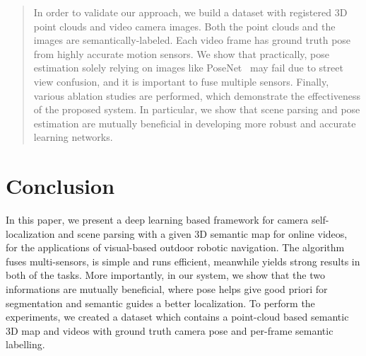 \documentclass[10pt,twocolumn,letterpaper]{article}
\begin{document}
\begin{abstract}
In order to validate our approach, we build a dataset with registered 3D point clouds and video camera images. Both the point clouds and the images are semantically-labeled. Each video frame has ground truth pose from highly accurate motion sensors.
We show that practically, pose estimation solely relying on images like PoseNet~\cite{Kendall_2015_ICCV} may fail due to street view confusion, and it is important to fuse multiple sensors. Finally, various ablation studies are performed, which demonstrate the effectiveness of the proposed system. In particular, we show that scene parsing and pose estimation are mutually beneficial in developing more robust and accurate learning networks.


\end{abstract}
\vspace{-0.5\baselineskip}







\vspace{-0.6\baselineskip}
\section{Conclusion}
\vspace{-0.4\baselineskip}
\label{sec:conclusion}
In this paper, we present a deep learning based framework for camera self-localization and scene parsing with a given 3D semantic map for online videos, for the applications of visual-based outdoor robotic navigation. The algorithm fuses multi-sensors, is simple and runs efficient, meanwhile yields strong results in both of the tasks. More importantly, in our system, we show that the two informations are mutually beneficial, where pose helps give good priori for segmentation and semantic guides a better localization. To perform the experiments, we created a dataset which contains a point-cloud based semantic 3D map and videos with ground truth camera pose and per-frame semantic labelling.
\end{document}
